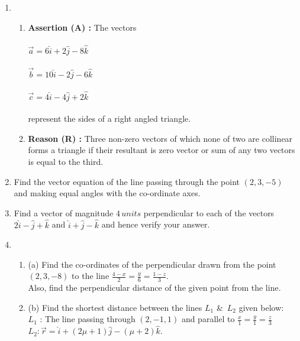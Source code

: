 \documentclass {article}
\providecommand{\brak}[1]{\ensuremath{\left(#1\right)}}\usepackage {enumitem}
\begin{document}
\begin {enumerate}
\item	\begin {enumerate}
\item [] \textbf{Assertion (A) :} The vectors \\ \\
		$\vec{a}=6\hat{i}+2\hat{j}-8\hat{k}$ \\ \\
		$\vec{b} = 10\hat{i}-2\hat{j}-6\hat{k}$  \\ \\
		$\vec{c} = 4\hat{i}-4\hat{j}+2\hat{k}$  \\ \\ 
		represent the sides of a right angled triangle.
\item [] \textbf{Reason (R)    :} Three non-zero vectors of which none of two are collinear forms a triangle if their resultant is zero vector or sum of any two vectors is equal to the third.
	\end {enumerate} 

\item Find the vector equation of the line passing through the point \brak{2, 3, -5} and making equal angles with the co-ordinate axes.

\item Find a vector of magnitude $4\,units$ perpendicular to each of the vectors $2\hat{i}-\hat{j}+\hat{k}$ and $\hat{i}+\hat{j}-\hat{k}$ and hence verify your answer.

\item \begin {enumerate}
\item [(a)] Find the co-ordinates of the perpendicular drawn from the point \brak{2, 3, -8} to the line $\frac{4-x}{2}=\frac{y}{6}=\frac{1-z}{3}$.\\Also, find the perpendicular distance of the given point from the line. 
       \item [(b)] Find the shortest distance between the lines $L_1$ \&\ $L_2$ given below: \\ $L_1$ : The line passing through $(2, -1, 1)$ and parallel to $\frac{x}{1}=\frac{y}{1}=\frac{z}{3}$\\$L_2: \vec{r} = \hat{i}+(2\mu+1)\hat{j}-(\mu+2)\hat{k}$. 
	\end {enumerate}

\end {enumerate}
\end{document}

